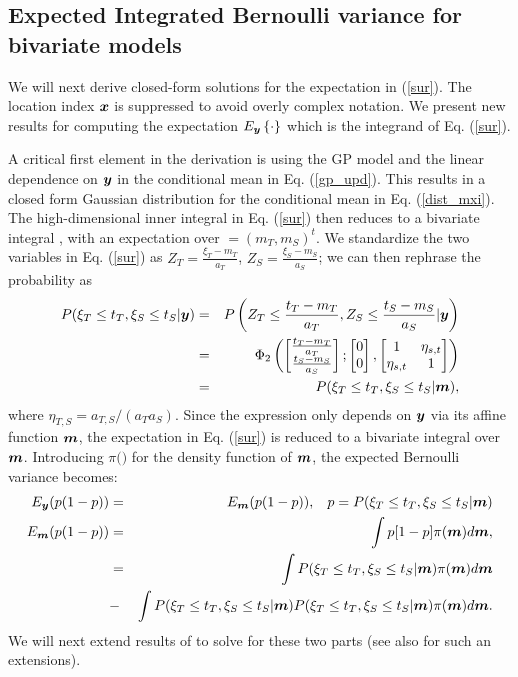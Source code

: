 \documentclass[aoas]{imsart}
\begin{document}
\subsection{Expected Integrated Bernoulli variance for bivariate models}

We will next derive closed-form solutions for the expectation in
(\ref{sur}). The location index ${\boldsymbol x}$ is suppressed to avoid overly
complex notation. We present new results for computing the expectation
$E_{{\boldsymbol y}}\left\{ \cdot \right\}$ which is the integrand of
Eq. (\ref{sur}).

A critical first element in the derivation is using the GP model and the
linear dependence on ${\boldsymbol y}$ in the conditional mean in
Eq. (\ref{gp_upd}). This results in a closed form Gaussian
distribution for the conditional mean in Eq. (\ref{dist_mxi}). The
high-dimensional inner integral in Eq. (\ref{sur}) then reduces to a
bivariate integral \citep{bhattacharjya2013value, chevalier2014fast},
with an expectation over $\bm=(m_{T},m_{S})^t$.  We standardize the two
variables in Eq. (\ref{sur}) as   $Z_T=\frac{\xi_T-m_{T}}{a_{T}}$,
$Z_S=\frac{\xi_S-m_{S}}{a_{S}}$; we can then rephrase the probability as
\begin{eqnarray}\label{ytom}
   P(\xi_T \leq t_T, \xi_S \leq t_S|\by) &=& P \left( Z_T \leq\frac{t_T-m_{T}}{a_{T}}, Z_S \leq\frac{t_S-m_{S}}{a_{S}}|\by \right) \nonumber \\
   &=& \Phi_2 \begin{pmatrix} 
\begin{bmatrix} \frac{t_T-m_{T}}{a_{T}}\\
\frac{t_S-m_{S}}{a_{S}}
\end{bmatrix};
 \begin{bmatrix} 0\\
0
\end{bmatrix},\begin{bmatrix}
1 & \eta_{s,t}  \\
\eta_{s,t}   & 1  
\end{bmatrix}\end{pmatrix} \nonumber \\
&=& P(\xi_T \leq t_T, \xi_S \leq t_S|\bm),
\end{eqnarray}
where $\eta_{T,S} =a_{T,S}/(a_{T} a_{S})$.
Since the expression only depends on ${\boldsymbol y}$ via its affine function ${\boldsymbol m}$, the expectation in Eq. (\ref{sur}) is reduced to a bivariate integral over ${\boldsymbol m}$. 
Introducing $\pi(\bm)$ for the density
function of ${\boldsymbol m}$, the expected Bernoulli variance becomes:
\begin{eqnarray}\label{eq:var2}
E_{\by}(p(1-p)) &=& E_{\bm}(p(1-p)), \hspace{3mm} p=P(\xi_T \leq t_T, \xi_S \leq t_S|\bm) \nonumber \\
E_{\bm}(p(1-p)) & = & \int p[1-p] \pi(\bm) d\bm, \nonumber \\
 &=& \int P(\xi_T \leq t_T, \xi_S \leq t_S|\bm)  \pi(\bm) d\bm \nonumber  \\
&-& \int P(\xi_T \leq t_T, \xi_S \leq t_S|\bm) P(\xi_T \leq t_T, \xi_S \leq t_S|\bm) \pi(\bm) d\bm. 
\end{eqnarray}
We will next extend results of \cite{chevalier2014fast} to solve for
these two parts (see also \cite{stroh} for such an extensions).
\end{document}

